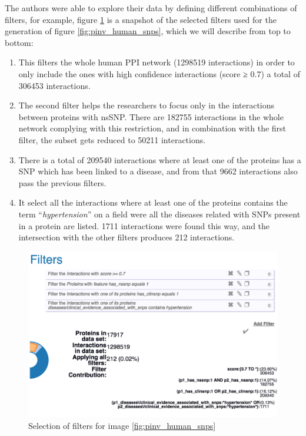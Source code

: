 The authors were able to explore their data by defining different combinations of filters, for example, figure \ref{fig:pinv_prefilters_snp} is a snapshot of the selected filters used for the generation of figure \ref{fig:pinv_human_snps}, which we will describe from top to bottom: 
\begin{enumerate}
\setlength\itemsep{-0.5em}
\item This filters the whole human PPI network (1298519 interactions) in order to only include the ones with high confidence interactions (score ≥ 0.7) a total of 306453 interactions.
\item The second filter helps the researchers to focus only in the interactions between proteins with nsSNP. There are 182755 interactions in the whole network complying with this restriction, and in combination with the first filter, the subset gets reduced to 50211 interactions.
\item There is a total of 209540 interactions where at least one of the proteins has a SNP which has been linked to a disease, and from that 9662 interactions also pass the previous filters.
\item It select all the interactions where at least one of the proteins contains the term ``\emph{hypertension}'' on a field were all the diseases related with SNPs present in a protein are listed. 1711 interactions were found this way, and the intersection with the other filters produces 212 interactions.
\end{enumerate}
\begin{figure}
\centering
\includegraphics[width=5in]{figures/pinv_prefilters_snp.png}
\caption[Selection of filters for image \ref{fig:pinv_human_snps}]{Selection of filters for image \ref{fig:pinv_human_snps}
\label{fig:pinv_prefilters_snp}}
\end{figure}

